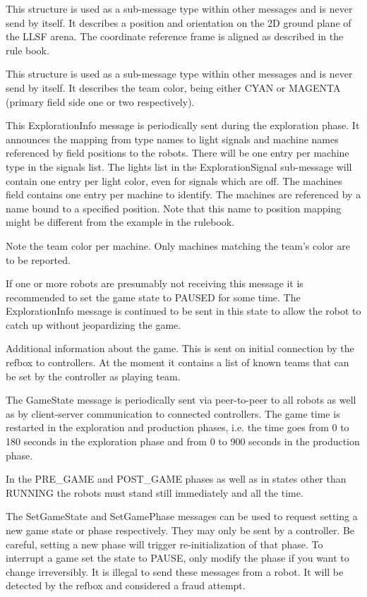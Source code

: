 \documentclass[a4paper]{article}
\begin{document}
%
{%
  This structure is used as a sub-message type within other messages
  and is never send by itself. It describes a position and orientation
  on the 2D ground plane of the LLSF arena. The coordinate reference
  frame is aligned as described in the rule book.
}

%
{%
  This structure is used as a sub-message type within other messages
  and is never send by itself. It describes the team color, being
  either CYAN or MAGENTA (primary field side one or two respectively).
}

%
{%
  This ExplorationInfo message is periodically sent during the
  exploration phase. It announces the mapping from type names to light
  signals and machine names referenced by field positions to the
  robots. There will be one entry per machine type in the signals
  list. The lights list in the ExplorationSignal sub-message will
  contain one entry per light color, even for signals which are
  off. The machines field contains one entry per machine to
  identify. The machines are referenced by a name bound to a specified
  position. Note that this name to position mapping might be different
  from the example in the rulebook.

  \smallskip
  Note the team color per machine. Only machines matching the team's
  color are to be reported.

  \medskip
  If one or more robots are presumably not receiving this message it
  is recommended to set the game state to PAUSED for some time. The
  ExplorationInfo message is continued to be sent in this state to
  allow the robot to catch up without jeopardizing the game.
}

%
{%
  Additional information about the game. This is sent on initial
  connection by the refbox to controllers. At the moment it contains a
  list of known teams that can be set by the controller as playing
  team.
}

%
{%
  The GameState message is periodically sent via peer-to-peer to all
  robots as well as by client-server communication to connected
  controllers. The game time is restarted in the exploration and
  production phases, i.e. the time goes from 0 to 180 seconds in the
  exploration phase and from 0 to 900 seconds in the production phase.

  \medskip

  In the PRE\_GAME and POST\_GAME phases as well as in states other
  than RUNNING the robots must stand still immediately and all the
  time.

  \medskip

  The SetGameState and SetGamePhase messages can be used to request
  setting a new game state or phase respectively. They may only be
  sent by a controller. Be careful, setting a new phase will trigger
  re-initialization of that phase. To interrupt a game set the state
  to PAUSE, only modify the phase if you want to change
  irreversibly. It is illegal to send these messages from a robot. It
  will be detected by the refbox and considered a fraud attempt.
}
\end{document}
